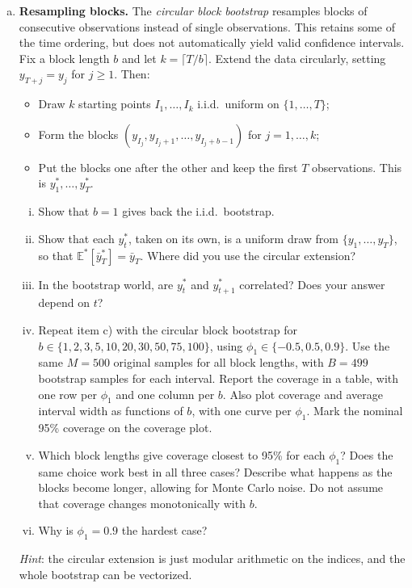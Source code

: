 \documentclass[11pt]{article}
\theoremstyle{definition}
\newcommand{\E}{\mathbb{E}}
\begin{document}
\begin{enumerate}[a)]
	\item \textbf{Resampling blocks.} The \textit{circular block bootstrap} resamples blocks of consecutive observations instead of single observations. This retains some of the time ordering, but does not automatically yield valid confidence intervals. Fix a block length $b$ and let $k = \lceil T/b \rceil$. Extend the data circularly, setting $y_{T+j} = y_j$ for $j \geq 1$. Then:
	\begin{itemize}
		\item Draw $k$ starting points $I_1, \dots, I_k$ i.i.d.\ uniform on $\{1, \dots, T\}$;
		\item Form the blocks $(y_{I_j}, y_{I_j+1}, \dots, y_{I_j+b-1})$ for $j = 1, \dots, k$;
		\item Put the blocks one after the other and keep the first $T$ observations. This is $y^*_1, \dots, y^*_T$.
	\end{itemize}
	\begin{enumerate}[(i)]
		\item Show that $b = 1$ gives back the i.i.d.\ bootstrap.
		\item Show that each $y^*_t$, taken on its own, is a uniform draw from $\{y_1, \dots, y_T\}$, so that $\E^*[\bar{y}^*_T] = \bar{y}_T$. Where did you use the circular extension?
		\item In the bootstrap world, are $y^*_t$ and $y^*_{t+1}$ correlated? Does your answer depend on $t$?
		\item Repeat item c) with the circular block bootstrap for $b \in \{1, 2, 3, 5, 10, 20, 30, 50, 75, 100\}$, using $\phi_1 \in \{-0.5, 0.5, 0.9\}$. Use the same $M = 500$ original samples for all block lengths, with $B = 499$ bootstrap samples for each interval. Report the coverage in a table, with one row per $\phi_1$ and one column per $b$. Also plot coverage and average interval width as functions of $b$, with one curve per $\phi_1$. Mark the nominal 95\% coverage on the coverage plot.
		\item Which block lengths give coverage closest to 95\% for each $\phi_1$? Does the same choice work best in all three cases? Describe what happens as the blocks become longer, allowing for Monte Carlo noise. Do not assume that coverage changes monotonically with $b$.
		\item Why is $\phi_1 = 0.9$ the hardest case?
	\end{enumerate}

	\textit{Hint}: the circular extension is just modular arithmetic on the indices, and the whole bootstrap can be vectorized.


\end{enumerate}
\end{document}
